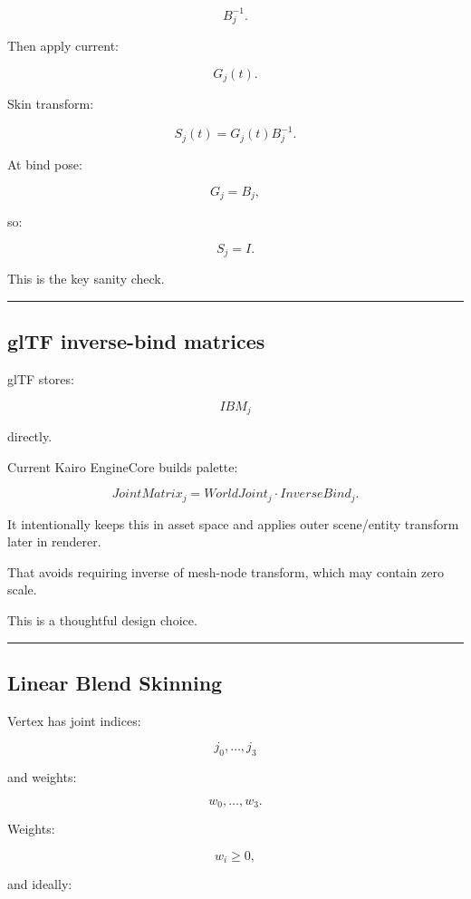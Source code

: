 \[
B_j^{-1}.
\]

Then apply current:

\[
G_j(t).
\]

Skin transform:

\[
\boxed{
S_j(t)
=
G_j(t)
B_j^{-1}.
}
\]

At bind pose:

\[
G_j=B_j,
\]

so:

\[
S_j=
I.
\]

This is the key sanity check.

\begin{center}\rule{0.5\linewidth}{0.5pt}\end{center}

\subsection{glTF inverse-bind matrices}\label{04-visual-computing-ii-ch041-gltf-inverse-bind-matrices}

glTF stores:

\[
IBM_j
\]

directly.

Current Kairo EngineCore builds palette:

\[
\boxed{
JointMatrix_j
=
WorldJoint_j
\cdot
InverseBind_j.
}
\]

It intentionally keeps this in asset space and applies outer scene/entity transform later in renderer.

That avoids requiring inverse of mesh-node transform, which may contain zero scale.

This is a thoughtful design choice.

\begin{center}\rule{0.5\linewidth}{0.5pt}\end{center}

\subsection{Linear Blend Skinning}\label{04-visual-computing-ii-ch041-linear-blend-skinning}

Vertex has joint indices:

\[
j_0,\dots,j_3
\]

and weights:

\[
w_0,\dots,w_3.
\]

Weights:

\[
w_i\ge0,
\]

and ideally:

